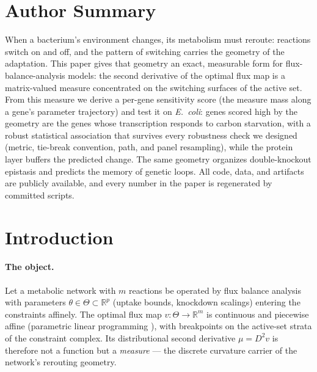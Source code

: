 \documentclass[11pt,a4paper]{article}
\theoremstyle{plain}
\theoremstyle{definition}
\theoremstyle{remark}
\newcommand{\RR}{\mathbb{R}}
\begin{document}
\bigskip
\section*{Author Summary}
When a bacterium's environment changes, its metabolism must reroute:
reactions switch on and off, and the pattern of switching carries the
geometry of the adaptation. This paper gives that geometry an exact,
measurable form for flux-balance-analysis models: the second derivative
of the optimal flux map is a matrix-valued measure concentrated on the
switching surfaces of the active set. From this measure we derive a
per-gene sensitivity score (the measure mass along a gene's parameter
trajectory) and test it on \emph{E.~coli}: genes scored high by the
geometry are the genes whose transcription responds to carbon
starvation, with a robust statistical association that survives every
robustness check we designed (metric, tie-break convention, path, and
panel resampling), while the protein layer buffers the predicted
change. The same geometry organizes double-knockout epistasis and
predicts the memory of genetic loops. All code, data, and artifacts
are publicly available, and every number in the paper is regenerated
by committed scripts.

\section{Introduction}\label{sec:intro}

\paragraph{The object.}
Let a metabolic network with $m$ reactions be operated by flux balance
analysis \citep{varma1994, orth2010} with parameters $\theta \in \Theta \subset \RR^p$ (uptake bounds,
knockdown scalings) entering the constraints affinely. The optimal flux map
$v : \Theta \to \RR^m$ is continuous and piecewise affine (parametric
linear programming \citep{borrelli2003}), with breakpoints on the active-set strata of the
constraint complex. Its distributional second derivative
$\mu = D^2 v$ is therefore not a function but a \emph{measure} --- the
discrete curvature carrier of the network's rerouting geometry.
\end{document}
